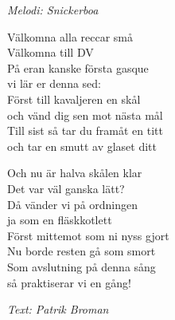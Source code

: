 {\footnotesize\textit{Melodi: Snickerboa}}\par
\vspace{10pt}
Välkomna alla reccar små\\
Välkomna till DV\\
På eran kanske första gasque\\
vi lär er denna sed:\\
Först till kavaljeren en skål\\
och vänd dig sen mot nästa mål\\
Till sist så tar du framåt en titt\\
och tar en smutt av glaset ditt\par
\vspace{10pt}
Och nu är halva skålen klar\\
Det var väl ganska lätt?\\
Då vänder vi på ordningen\\
ja som en fläskkotlett\\
Först mittemot som ni nyss gjort\\
Nu borde resten gå som smort\\
Som avslutning på denna sång\\
så praktiserar vi en gång!\par
\vspace{10pt}
{\footnotesize\textit{Text: Patrik Broman}}
